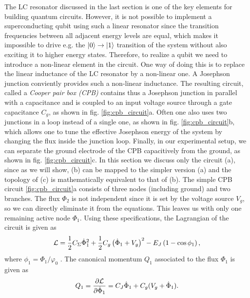 The LC resonator discussed in the last section is one of the key elements for building quantum circuits. However, it is not possible to implement a superconducting qubit using such a linear resonator since the transition frequencies between all adjacent energy levels are equal, which makes it impossible to drive e.g. the $\left| 0 \right>\to\left| 1 \right>$ transition of the system without also exciting it to higher energy states. Therefore, to realize a qubit we need to introduce a non-linear element in the circuit. One way of doing this is to replace the linear inductance of the LC resonator by a non-linear one. A Josephson junction conviently provides such a non-linear inductance. The resulting circuit, called a {\it Cooper pair box (CPB)} contains thus a Josephson junction in parallel with a capacitance and is coupled to an input voltage source through a gate capacitance $C_g$, as shown in fig. \ref{fig:cpb_circuit}a. Often one also uses two junctions in a loop instead of a single one, as shown in fig. \ref{fig:cpb_circuit}b, which allows one to tune the effective Josephson energy of the system by changing the flux inside the junction loop. Finally, in our experimental setup, we can separate the ground electrode of the CPB capacitively from the ground, as shown in fig. \ref{fig:cpb_circuit}c. In this section we discuss only the circuit (a), since as we will show, (b) can be mapped to the simpler version (a) and the topology of (c) is mathematically equivalent to that of (b). The simple CPB circuit \ref{fig:cpb_circuit}a consists of  three nodes (including ground) and two branches. The flux $\Phi_2$ is not independent since it is set by the voltage source $V_g$, so we can directly eliminate it from the equations. This leaves us with only one remaining active node $\Phi_1$. Using these specifications, the Lagrangian of the circuit is given as
%
\begin{equation}
\begin{mathcal}L\end{mathcal}=\frac{1}{2}C_\Sigma\dot{\Phi}_1^2+\frac{1}{2}C_g\left(\dot{\Phi}_1+V_g\right)^2-E_J\left(1-\cos{\phi_1}\right),
\end{equation}
%
where $\phi_1=\Phi_1/\varphi_0$ . The canonical momentum $Q_1$ associated to the flux $\Phi_1$ is given as
%
\begin{equation}
Q_1 = \frac{\partial \begin{mathcal}L\end{mathcal}}{\partial \dot{\Phi}_1} = C_J \dot{\Phi}_1+C_g(V_g+\dot{\Phi}_1). \label{eq:q_of_phi}
\end{equation}
